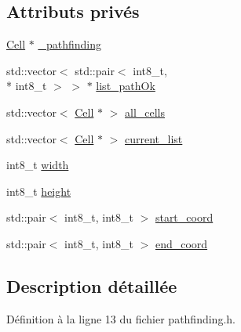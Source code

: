 \subsection*{Attributs privés}
\begin{DoxyCompactItemize}
\item 
\hyperlink{class_cell}{Cell} $\ast$ \hyperlink{class_path_finding_a042d47e6d4115a112e0570afe6a88897}{\-\_\-pathfinding}
\item 
std\-::vector$<$ std\-::pair$<$ int8\-\_\-t, \\*
int8\-\_\-t $>$ $>$ $\ast$ \hyperlink{class_path_finding_a489cfbcdff32e661c7783caec686321a}{list\-\_\-path\-Ok}
\item 
std\-::vector$<$ \hyperlink{class_cell}{Cell} $\ast$ $>$ \hyperlink{class_path_finding_a042ed04ef5c507a6a575bde3c7aee317}{all\-\_\-cells}
\item 
std\-::vector$<$ \hyperlink{class_cell}{Cell} $\ast$ $>$ \hyperlink{class_path_finding_a78443d74b8dfff09953f63f40a1768c8}{current\-\_\-list}
\item 
int8\-\_\-t \hyperlink{class_path_finding_a50f9513402ad1113678635c3eb9da62d}{width}
\item 
int8\-\_\-t \hyperlink{class_path_finding_a61e5643d7459d24b07306a6886348ca1}{height}
\item 
std\-::pair$<$ int8\-\_\-t, int8\-\_\-t $>$ \hyperlink{class_path_finding_a33dac4c9b17f5e6032bc0fc60e7a8249}{start\-\_\-coord}
\item 
std\-::pair$<$ int8\-\_\-t, int8\-\_\-t $>$ \hyperlink{class_path_finding_a7db7c62b00778fb60be8fdb10c471851}{end\-\_\-coord}
\end{DoxyCompactItemize}


\subsection{Description détaillée}


Définition à la ligne 13 du fichier pathfinding.\-h.



